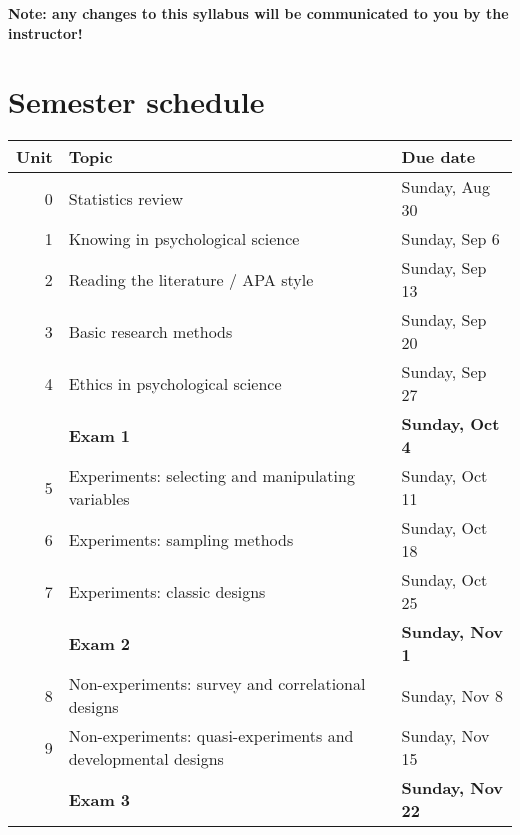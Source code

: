 \documentclass[10pt]{article}
\begin{document}
\textbf{Note:  any changes to this syllabus will be communicated to you by the instructor!}

\section*{Semester schedule}
\label{sec:org9e0e7f0}

\begin{center}
\begin{tabular}{rll}
Unit & Topic & Due date\\
\hline
0 & Statistics review & Sunday, Aug 30\\
1 & Knowing in psychological science & Sunday, Sep 6\\
2 & Reading the literature / APA style & Sunday, Sep 13\\
3 & Basic research methods & Sunday, Sep 20\\
4 & Ethics in psychological science & Sunday, Sep 27\\
 & \textbf{Exam 1} & \textbf{Sunday, Oct 4}\\
5 & Experiments: selecting and manipulating variables & Sunday, Oct 11\\
6 & Experiments: sampling methods & Sunday, Oct 18\\
7 & Experiments: classic designs & Sunday, Oct 25\\
 & \textbf{Exam 2} & \textbf{Sunday, Nov 1}\\
8 & Non-experiments: survey and correlational designs & Sunday, Nov 8\\
9 & Non-experiments: quasi-experiments and developmental designs & Sunday, Nov 15\\
 & \textbf{Exam 3} & \textbf{Sunday, Nov 22}\\
\end{tabular}
\end{center}
\end{document}
